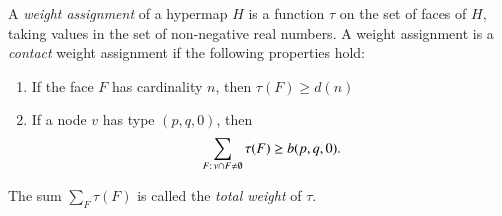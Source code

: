 \begin{definition}
%
A {\it weight assignment\/} of a hypermap $H$ is a function $\tau$ on
the set of faces of $H$, taking values in the set of non-negative
real numbers. A weight assignment is a {\it contact} weight assignment if the
following properties hold:
%
\begin{enumerate}
  \item If the face $F$ has cardinality $n$, then
        $\tau(F) \ge d(n)$
  \item If a node $v$ has type $(p,q,0)$, then
        $$\sum_{F:\,v\cap F\ne\emptyset} \tau(F) \ge b{(p,q,0)}.$$
\end{enumerate}
The sum $\sum_F \tau(F)$ is called the {\it total weight} of $\tau$.
\end{definition}



